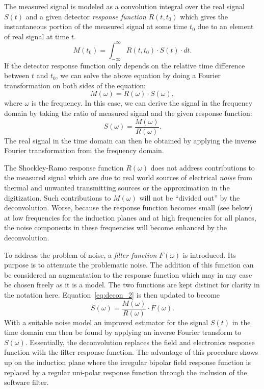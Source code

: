 The measured signal is
modeled as a convolution integral over the real signal $S(t)$ and a
given detector \textit{response function} $R(t,t_0)$ which gives the
instantaneous portion of the measured signal at some time $t_0$ due to
an element of real signal at time $t$.
\begin{equation}\label{eq:decon_1}
M(t_0) = \int_{-\infty}^{\infty}  R(t,t_0) \cdot S(t) \cdot dt.
\end{equation}
If the detector response function only depends on the relative time 
difference between $t$ and $t_0$, we can solve the above equation by 
doing a Fourier transformation on both sides of the equation:
\begin{equation}
M(\omega) = R(\omega) \cdot S(\omega), 
\end{equation}
where $\omega$ is the frequency. In this case, we can derive the signal in the 
frequency domain by taking the ratio of measured signal and the given
response function:
\begin{equation}\label{eq:decon_2}
S(\omega) = \frac{M(\omega)}{R(\omega)}.
\end{equation}
The real signal in the time domain can then be obtained by applying the 
inverse Fourier transformation from the frequency domain. 

The Shockley-Ramo response function $R(\omega)$ does not address
contributions to the measured signal which are due to real world
sources of electrical \textit{noise} from thermal and unwanted transmitting
sources or the approximation in the digitization.
Such contributions to $M(\omega)$ will not be ``divided out'' by the deconvolution.
Worse, because the response function becomes small (see below) at low 
frequencies for the induction planes and at high frequencies for all
planes, the noise components in these frequencies will become
enhanced by the deconvolution.

To address the problem of noise, a \textit{filter function} $F(\omega)$ is
introduced.  Its purpose is to attenuate the problematic noise.  The
addition of this function can be considered an augmentation to the
response function which may in any case be chosen freely as it is a model.  
The two functions are kept distinct for clarity in the notation here.
Equation~\ref{eq:decon_2} is then updated to become
\begin{equation}\label{eq:decon_filt}
S(\omega) = \frac{M(\omega)}{R(\omega)} \cdot F(\omega).
\end{equation}
With a suitable noise model an improved estimator for the signal
$S(t)$ in the time domain can then be found by applying an inverse Fourier 
transform to $S(\omega)$.  Essentially, the deconvolution replaces the field and 
electronics response function with the filter response function. The 
advantage of this procedure shows up on the induction plane where the irregular bipolar 
field response function is replaced by a regular uni-polar response function through
the inclusion of the software filter. 

